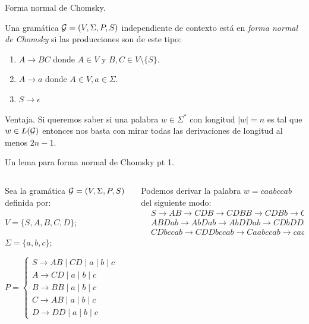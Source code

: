 \documentclass[aspectratio=169, 11pt]{beamer}
\begin{document}
	\begin{frame}[fragile]{Forma normal de Chomsky.}
		\begin{deff}
			Una gramática ${\cal G} = (V, \Sigma, P, S)$ independiente de contexto está en \emph{forma normal de Chomsky} si las producciones son de este tipo:
			\begin{enumerate}
				\item $A \to BC$ donde $A\in V$ y $B,C \in V \setminus \{ S \}$.
				\item $A \to a$ donde $A \in V, a \in \Sigma$.
				\item $S \to \epsilon$ 
			\end{enumerate}
		\end{deff}
		\begin{alertblock}{Ventaja.}
			Si queremos saber si una palabra $w \in \Sigma^{*}$ con longitud $|w| = n$ es tal que $w \in L({\cal G})$ entonces nos basta con mirar todas las derivaciones de longitud al menos $2n-1$.
		\end{alertblock}
	\end{frame}

	\begin{frame}[fragile]{Un lema para forma normal de Chomsky pt 1.}
		
		\begin{columns}
			
			\begin{column}{0.5\textwidth}
				Sea la gramática ${\cal G} = (V, \Sigma, P, S)$ definida por:
				
					 $V = \{ S,A,B,C,D \}$;

					 $\Sigma = \{ a,b,c \}$;
					 
						
						$P = \begin{cases}
								S \to AB \mid CD \mid a \mid b \mid c \\
								A \to CD \mid a \mid b \mid c	\\
								B \to BB \mid a \mid b \mid c	\\
								C \to AB \mid a \mid b \mid c	\\
								D \to DD \mid a \mid b \mid c
						\end{cases}$
						
				
			\end{column}

			\begin{column}{0.5 \textwidth}
				Podemos derivar la palabra $w = caabccab$ del siguiente modo:
				\begin{align*}
					&S \to AB \to CDB \to CDBB \to CDBb \to CDab \to \\
					&ABDab  \to  AbDab   \to AbDDab  \to CDbDDab   \to\\
					&CDbccab  \to CDDbccab \to Caabccab \to caabccab \\
				\end{align*}
			\end{column}
		\end{columns}
	\end{frame}
\end{document}
